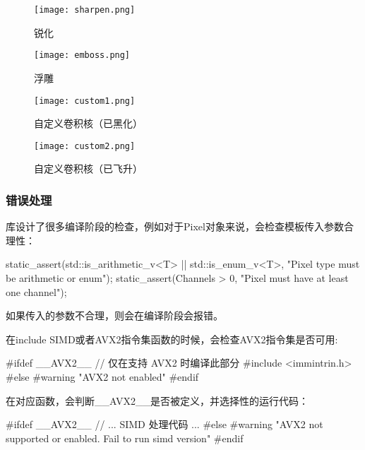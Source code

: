 \documentclass[11pt]{article}
\begin{document}
\begin{figure}[H]
  \centering
  \begin{minipage}[b]{0.49\textwidth}
    \centering
    \texttt{[image: sharpen.png]}
   \caption{锐化}
    \label{fig:example}
  \end{minipage}
  \hfill %
  \begin{minipage}[b]{0.49\textwidth}
    \centering
    \texttt{[image: emboss.png]}
  \caption{浮雕}
    \label{fig:example}
  \end{minipage}
\end{figure}


\begin{figure}[H]
  \centering
  \begin{minipage}[b]{0.49\textwidth}
    \centering
    \texttt{[image: custom1.png]}
   \caption{自定义卷积核（已黑化）}
    \label{fig:example}
  \end{minipage}
  \hfill %
  \begin{minipage}[b]{0.49\textwidth}
    \centering
    \texttt{[image: custom2.png]}
  \caption{自定义卷积核（已飞升）}
    \label{fig:example}
  \end{minipage}
\end{figure}

\subsubsection{错误处理}
库设计了很多编译阶段的检查，例如对于Pixel对象来说，会检查模板传入参数合理性：
\begin{codeline}
  static_assert(std::is_arithmetic_v<T> || std::is_enum_v<T>, 
                "Pixel type must be arithmetic or enum");
  static_assert(Channels > 0, "Pixel must have at least one channel");
\end{codeline}
如果传入的参数不合理，则会在编译阶段会报错。


在include SIMD或者AVX2指令集函数的时候，会检查AVX2指令集是否可用:
\begin{codeline}
  #ifdef __AVX2__ // 仅在支持 AVX2 时编译此部分
    #include <immintrin.h> 
  #else
    #warning "AVX2 not enabled"
  #endif
\end{codeline}
在对应函数，会判断\_\_AVX2\_\_是否被定义，并选择性的运行代码：
\begin{codeline}
  #ifdef __AVX2__
    // ... SIMD 处理代码 ...
  #else
    #warning "AVX2 not supported or enabled. Fail to run simd version"
  #endif 
\end{codeline}
\end{document}
